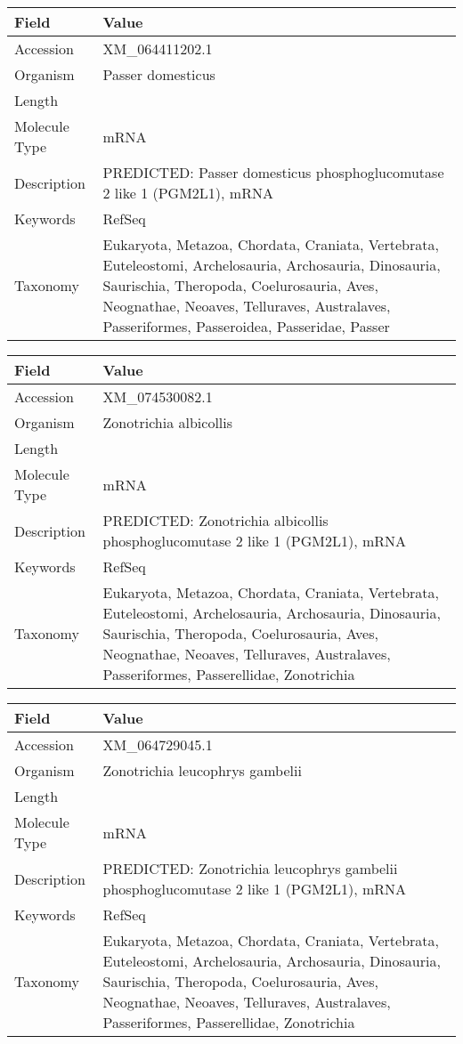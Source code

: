 \documentclass[10pt]{article}
\begin{document}
{\footnotesize
\begin{longtable}{>{\raggedright\arraybackslash}p{4.5cm} >{\raggedright\arraybackslash}p{11.5cm}}
\textbf{Field} & \textbf{Value} \\
\hline
Accession & XM\_064411202.1 \\
Organism & Passer domesticus \\
Length & 5381 \\
Molecule Type & mRNA \\
Description & PREDICTED: Passer domesticus phosphoglucomutase 2 like 1 (PGM2L1), mRNA \\
Keywords & RefSeq \\
Taxonomy & Eukaryota, Metazoa, Chordata, Craniata, Vertebrata, Euteleostomi, Archelosauria, Archosauria, Dinosauria, Saurischia, Theropoda, Coelurosauria, Aves, Neognathae, Neoaves, Telluraves, Australaves, Passeriformes, Passeroidea, Passeridae, Passer \\
\end{longtable}
}

{\footnotesize
\begin{longtable}{>{\raggedright\arraybackslash}p{4.5cm} >{\raggedright\arraybackslash}p{11.5cm}}
\textbf{Field} & \textbf{Value} \\
\hline
Accession & XM\_074530082.1 \\
Organism & Zonotrichia albicollis \\
Length & 5361 \\
Molecule Type & mRNA \\
Description & PREDICTED: Zonotrichia albicollis phosphoglucomutase 2 like 1 (PGM2L1), mRNA \\
Keywords & RefSeq \\
Taxonomy & Eukaryota, Metazoa, Chordata, Craniata, Vertebrata, Euteleostomi, Archelosauria, Archosauria, Dinosauria, Saurischia, Theropoda, Coelurosauria, Aves, Neognathae, Neoaves, Telluraves, Australaves, Passeriformes, Passerellidae, Zonotrichia \\
\end{longtable}
}

{\footnotesize
\begin{longtable}{>{\raggedright\arraybackslash}p{4.5cm} >{\raggedright\arraybackslash}p{11.5cm}}
\textbf{Field} & \textbf{Value} \\
\hline
Accession & XM\_064729045.1 \\
Organism & Zonotrichia leucophrys gambelii \\
Length & 5362 \\
Molecule Type & mRNA \\
Description & PREDICTED: Zonotrichia leucophrys gambelii phosphoglucomutase 2 like 1 (PGM2L1), mRNA \\
Keywords & RefSeq \\
Taxonomy & Eukaryota, Metazoa, Chordata, Craniata, Vertebrata, Euteleostomi, Archelosauria, Archosauria, Dinosauria, Saurischia, Theropoda, Coelurosauria, Aves, Neognathae, Neoaves, Telluraves, Australaves, Passeriformes, Passerellidae, Zonotrichia \\
\end{longtable}
}
\end{document}
